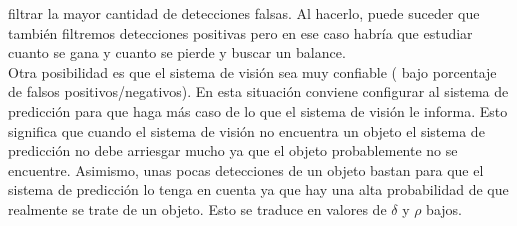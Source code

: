 	filtrar la mayor cantidad de detecciones falsas. Al hacerlo, puede 
	suceder que también filtremos detecciones positivas pero en ese 
	caso habría que estudiar cuanto se gana y cuanto se pierde y 
	buscar un balance.\\
	\indent Otra posibilidad es que el sistema de visión sea muy 
	confiable ( bajo porcentaje de falsos positivos/negativos). En 
	esta situación conviene configurar al sistema de predicción para 
	que haga más caso de lo que el sistema de visión le informa. Esto 
	significa que cuando el sistema de visión no encuentra un objeto 
	el sistema de predicción no debe arriesgar mucho ya que el objeto 
	probablemente no se encuentre. Asimismo, unas pocas detecciones de 
	un objeto bastan para que el sistema de predicción lo tenga 
	en cuenta  ya que hay una alta probabilidad de que 
	realmente se trate de un objeto. Esto se traduce en valores de 
	$\delta$ y $\rho$ bajos.
 



